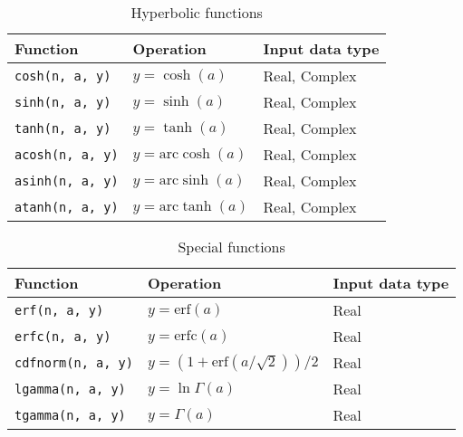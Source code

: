 \begin{table}
  \begin{tabularx}{\textwidth}{LLL}
    \toprule
    Function & Operation & Input data type \\
    \midrule
    \texttt{cosh(n, a, y)}  & $y = \cosh(a)$             & Real, Complex \\
    \texttt{sinh(n, a, y)}  & $y = \sinh(a)$             & Real, Complex \\
    \texttt{tanh(n, a, y)}  & $y = \tanh(a)$             & Real, Complex \\
    \texttt{acosh(n, a, y)} & $y = \mathrm{arc}\cosh(a)$ & Real, Complex \\
    \texttt{asinh(n, a, y)} & $y = \mathrm{arc}\sinh(a)$ & Real, Complex \\
    \texttt{atanh(n, a, y)} & $y = \mathrm{arc}\tanh(a)$ & Real, Complex \\
    \bottomrule
  \end{tabularx}
  \caption{Hyperbolic functions}
  \label{tab:Hyperbolic functions}
\end{table}

\begin{table}
  \begin{tabularx}{\textwidth}{LLL}
    \toprule
    Function & Operation & Input data type \\
    \midrule
    \texttt{erf(n, a, y)}     & $y = \mathrm{erf}(a)$  & Real \\
    \texttt{erfc(n, a, y)}    & $y = \mathrm{erfc}(a)$ & Real \\
    \texttt{cdfnorm(n, a, y)} & $y = (1 + \mathrm{erf}(a / \sqrt{2})) / 2$
    & Real \\
    \texttt{lgamma(n, a, y)}  & $y = \ln\Gamma(a)$     & Real \\
    \texttt{tgamma(n, a, y)}  & $y = \Gamma(a)$        & Real \\
    \bottomrule
  \end{tabularx}
  \caption{Special functions}
  \label{tab:Special functions}
\end{table}

